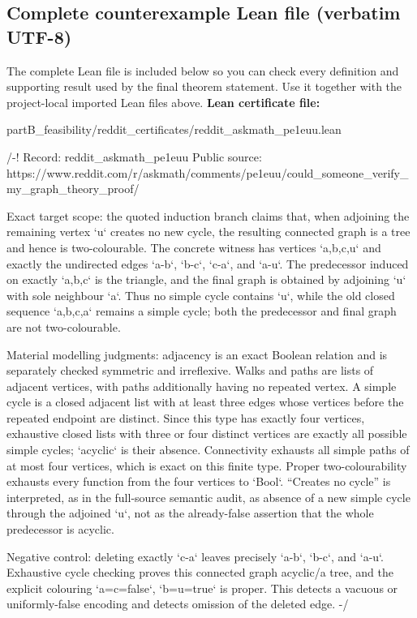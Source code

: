\documentclass[11pt]{article}
\begin{document}
\subsection*{Complete counterexample Lean file (verbatim UTF-8)}
The complete Lean file is included below so you can check every definition and supporting result used by the final theorem statement. Use it together with the project-local imported Lean files above.
\textbf{Lean certificate file:}
\begin{Vsrc}
partB_feasibility/reddit_certificates/reddit_askmath_pe1euu.lean
\end{Vsrc}
\begin{Vlean}
/-!
Record: reddit_askmath_pe1euu
Public source: https://www.reddit.com/r/askmath/comments/pe1euu/could_someone_verify_my_graph_theory_proof/

Exact target scope: the quoted induction branch claims that, when adjoining the
remaining vertex `u` creates no new cycle, the resulting connected graph is a
tree and hence is two-colourable.  The concrete witness has vertices
`{a,b,c,u}` and exactly the undirected edges `a-b`, `b-c`, `c-a`, and `a-u`.
The predecessor induced on exactly `{a,b,c}` is the triangle, and the final
graph is obtained by adjoining `u` with sole neighbour `a`.  Thus no simple
cycle contains `u`, while the old closed sequence `a,b,c,a` remains a simple
cycle; both the predecessor and final graph are not two-colourable.

Material modelling judgments: adjacency is an exact Boolean relation and is
separately checked symmetric and irreflexive.  Walks and paths are lists of
adjacent vertices, with paths additionally having no repeated vertex.  A simple
cycle is a closed adjacent list with at least three edges whose vertices before
the repeated endpoint are distinct.  Since this type has exactly four
vertices, exhaustive closed lists with three or four distinct vertices are
exactly all possible simple cycles; `acyclic` is their absence.  Connectivity
exhausts all simple paths of at most four vertices, which is exact on this
finite type.  Proper two-colourability exhausts every function from the four
vertices to `Bool`.  “Creates no cycle” is interpreted, as in the full-source
semantic audit, as absence of a new simple cycle through the adjoined `u`, not
as the already-false assertion that the whole predecessor is acyclic.

Negative control: deleting exactly `c-a` leaves precisely `a-b`, `b-c`, and
`a-u`.  Exhaustive cycle checking proves this connected graph acyclic/a tree,
and the explicit colouring `a=c=false`, `b=u=true` is proper.  This detects a
vacuous or uniformly-false encoding and detects omission of the deleted edge.
-/


\end{Vlean}
\end{document}
